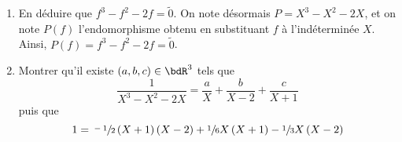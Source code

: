 \documentclass[a4paper,french,bookmarks]{article}
\begin{document}
\begin{enumerate}
\begin{enumerate}
        \item En déduire que $f^3 - f^2 - 2f = \widetilde 0$. On note
        désormais $P = X^3 - X^2 - 2X$, et on note $P\left(f\right)$
        l'endomorphisme obtenu en substituant $f$ à l’indéterminée $X$.
        Ainsi, $P\left(f\right) = f^3 - f^2 - 2f = \widetilde 0$.
        
        
        \item Montrer qu'il existe $\left(a, b, c\right) \in \bdR^3$
        tels que
        \begin{equation}
            \dfrac{1}{X^3 - X^2 - 2X} = \dfrac{a}{X} + \dfrac{b}{X-2} +
            \dfrac{c}{X+1}
        \end{equation}
        puis que 
        \begin{equation}
             1 = \sfrac{-1}{2}\left(X + 1\right)\left(X - 2\right) +
             \sfrac{1}{6}X\left(X+1\right) -
             \sfrac{1}{3}X\left(X-2\right)
        \end{equation}
        
\end{enumerate}
\end{enumerate}
\end{document}
